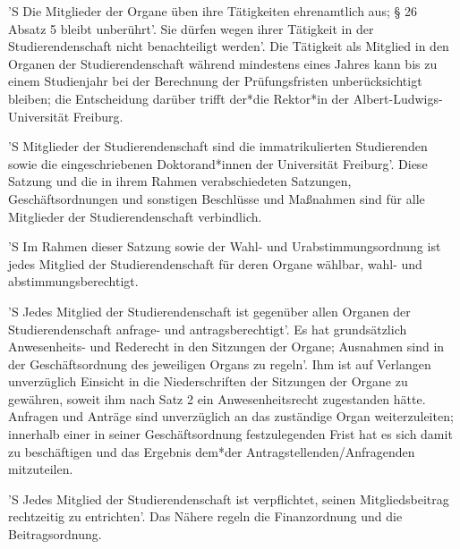 \documentclass[fontsize=12pt,parskip=half]{scrartcl}
\begin{document}
\begin{contract}
  'S Die Mitglieder der Organe üben ihre Tätigkeiten ehrenamtlich aus; § 26 Absatz
  5 bleibt unberührt'. Sie dürfen wegen ihrer Tätigkeit in der Studierendenschaft
  nicht benachteiligt werden'. Die Tätigkeit als Mitglied in den Organen der
  Studierendenschaft während mindestens eines Jahres kann bis zu einem
  Studienjahr bei der Berechnung der Prüfungsfristen unberücksichtigt bleiben;
  die Entscheidung darüber trifft der*die Rektor*in der
  Albert-Ludwigs-Universität Freiburg.



  'S Mitglieder der Studierendenschaft sind die immatrikulierten Studierenden sowie
  die eingeschriebenen Doktorand*innen der Universität Freiburg'. Diese Satzung
  und die in ihrem Rahmen verabschiedeten Satzungen, Geschäftsordnungen und
  sonstigen Beschlüsse und Maßnahmen sind für alle Mitglieder der
  Studierendenschaft verbindlich.

  'S Im Rahmen dieser Satzung sowie der Wahl- und Urabstimmungsordnung ist jedes
  Mitglied der Studierendenschaft für deren Organe wählbar, wahl- und
  abstimmungsberechtigt.

  'S Jedes Mitglied der Studierendenschaft ist gegenüber allen Organen der
  Studierendenschaft anfrage- und antragsberechtigt'. Es hat grundsätzlich
  Anwesenheits- und Rederecht in den Sitzungen der Organe; Ausnahmen sind in der
  Geschäftsordnung des jeweiligen Organs zu regeln'. Ihm ist auf Verlangen
  unverzüglich Einsicht in die Niederschriften der Sitzungen der Organe zu
  gewähren, soweit ihm nach Satz 2 ein Anwesenheitsrecht zugestanden hätte.
  Anfragen und Anträge sind unverzüglich an das zuständige Organ weiterzuleiten;
  innerhalb einer in seiner Geschäftsordnung festzulegenden Frist hat es sich
  damit zu beschäftigen und das Ergebnis dem*der Antragstellenden/Anfragenden
  mitzuteilen.

  'S Jedes Mitglied der Studierendenschaft ist verpflichtet, seinen
  Mitgliedsbeitrag rechtzeitig zu entrichten'. Das Nähere regeln die
  Finanzordnung und die Beitragsordnung.

\end{contract}

\end{document}
